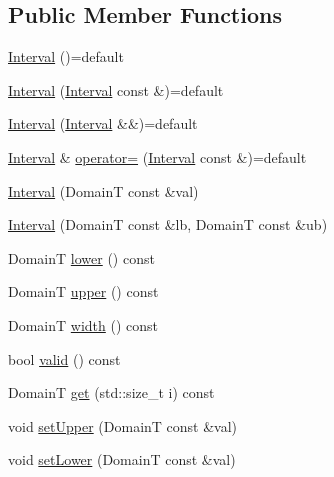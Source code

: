 \subsection*{Public Member Functions}
\begin{DoxyCompactItemize}
\item 
\hyperlink{structvt_1_1term_1_1interval_1_1_interval_aa92ceaec8b9d5448c67b8aa39606c91c}{Interval} ()=default
\item 
\hyperlink{structvt_1_1term_1_1interval_1_1_interval_a75b627acf7c30e4bb48b49ea323842f3}{Interval} (\hyperlink{structvt_1_1term_1_1interval_1_1_interval}{Interval} const \&)=default
\item 
\hyperlink{structvt_1_1term_1_1interval_1_1_interval_acf0d2f1a988e5afff0a9414ff2340f09}{Interval} (\hyperlink{structvt_1_1term_1_1interval_1_1_interval}{Interval} \&\&)=default
\item 
\hyperlink{structvt_1_1term_1_1interval_1_1_interval}{Interval} \& \hyperlink{structvt_1_1term_1_1interval_1_1_interval_a4077994c7d471be55c10ebbe222f6e58}{operator=} (\hyperlink{structvt_1_1term_1_1interval_1_1_interval}{Interval} const \&)=default
\item 
\hyperlink{structvt_1_1term_1_1interval_1_1_interval_ac4d9f09fc40777980cb6b7efc3bc2d0d}{Interval} (DomainT const \&val)
\item 
\hyperlink{structvt_1_1term_1_1interval_1_1_interval_a9e1d8a552f0f204c9e391ac47cca7b1b}{Interval} (DomainT const \&lb, DomainT const \&ub)
\item 
DomainT \hyperlink{structvt_1_1term_1_1interval_1_1_interval_a36da58c3174932da9889d973c2940789}{lower} () const
\item 
DomainT \hyperlink{structvt_1_1term_1_1interval_1_1_interval_acbe552f15a1f22a89fa43bcba34fe27f}{upper} () const
\item 
DomainT \hyperlink{structvt_1_1term_1_1interval_1_1_interval_af3222f61f45e1e5a7fdd5a127e300289}{width} () const
\item 
bool \hyperlink{structvt_1_1term_1_1interval_1_1_interval_a563160f1b6e405bb9d11255a0b80d187}{valid} () const
\item 
DomainT \hyperlink{structvt_1_1term_1_1interval_1_1_interval_aff4a5032ac979adcc393022e77acffb6}{get} (std\+::size\+\_\+t i) const
\item 
void \hyperlink{structvt_1_1term_1_1interval_1_1_interval_af77c4efbf790b76fcb92bb5db65299f5}{set\+Upper} (DomainT const \&val)
\item 
void \hyperlink{structvt_1_1term_1_1interval_1_1_interval_a23bacd3eae47ae66f9cf22c1a2fa2567}{set\+Lower} (DomainT const \&val)

\end{DoxyCompactItemize}

